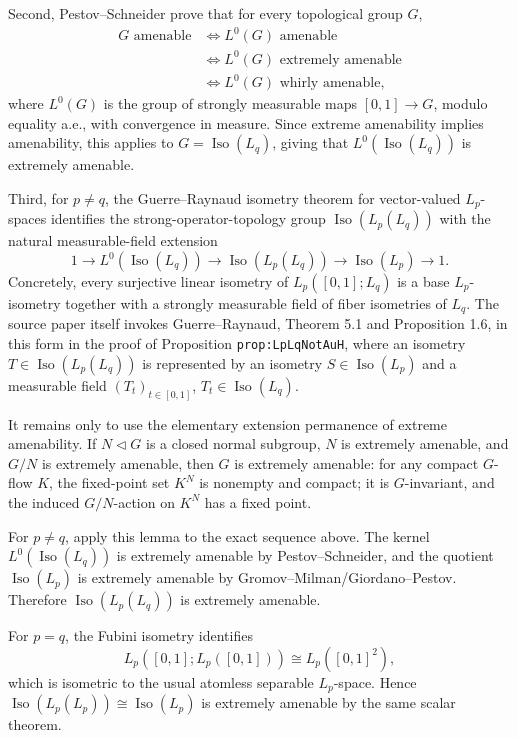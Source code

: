 \documentclass[11pt]{amsart}
\DeclareMathOperator{\Iso}{Iso}
\begin{document}
Second, Pestov--Schneider prove that for every topological group \(G\),
\[
  \begin{aligned}
  G\text{ amenable}
  &\Longleftrightarrow
  L^0(G)\text{ amenable}\\
  &\Longleftrightarrow
  L^0(G)\text{ extremely amenable}\\
  &\Longleftrightarrow
  L^0(G)\text{ whirly amenable},
  \end{aligned}
\]
where \(L^0(G)\) is the group of strongly measurable maps
\([0,1]\to G\), modulo equality a.e., with convergence in measure.
Since extreme amenability implies amenability, this applies to
\(G=\Iso(L_q)\), giving that \(L^0(\Iso(L_q))\) is extremely amenable.

Third, for \(p\neq q\), the Guerre--Raynaud isometry theorem for vector-valued
\(L_p\)-spaces identifies the strong-operator-topology group
\(\Iso(L_p(L_q))\) with the natural measurable-field extension
\[
  1 \longrightarrow L^0(\Iso(L_q))
  \longrightarrow \Iso(L_p(L_q))
  \longrightarrow \Iso(L_p)
  \longrightarrow 1.
\]
Concretely, every surjective linear isometry of \(L_p([0,1];L_q)\) is a
base \(L_p\)-isometry together with a strongly measurable field of fiber
isometries of \(L_q\). The source paper itself invokes Guerre--Raynaud,
Theorem 5.1 and Proposition 1.6, in this form in the proof of Proposition
\texttt{prop:LpLqNotAuH}, where an isometry \(T\in \Iso(L_p(L_q))\) is
represented by an isometry \(S\in\Iso(L_p)\) and a measurable field
\((T_t)_{t\in[0,1]}\), \(T_t\in\Iso(L_q)\).

It remains only to use the elementary extension permanence of extreme
amenability. If \(N\triangleleft G\) is a closed normal subgroup, \(N\) is
extremely amenable, and \(G/N\) is extremely amenable, then \(G\) is extremely
amenable: for any compact \(G\)-flow \(K\), the fixed-point set \(K^N\) is
nonempty and compact; it is \(G\)-invariant, and the induced \(G/N\)-action on
\(K^N\) has a fixed point.

For \(p\neq q\), apply this lemma to the exact sequence above. The kernel
\(L^0(\Iso(L_q))\) is extremely amenable by Pestov--Schneider, and the quotient
\(\Iso(L_p)\) is extremely amenable by Gromov--Milman/Giordano--Pestov.
Therefore \(\Iso(L_p(L_q))\) is extremely amenable.

For \(p=q\), the Fubini isometry identifies
\[
  L_p([0,1];L_p([0,1])) \cong L_p([0,1]^2),
\]
which is isometric to the usual atomless separable \(L_p\)-space. Hence
\(\Iso(L_p(L_p))\cong\Iso(L_p)\) is extremely amenable by the same scalar
theorem.
\end{document}
